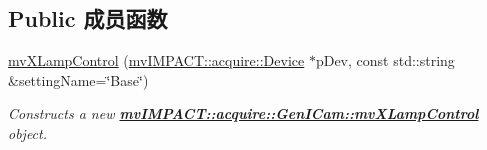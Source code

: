 \subsection*{Public 成员函数}
\begin{DoxyCompactItemize}
\item 
\hyperlink{classmv_i_m_p_a_c_t_1_1acquire_1_1_gen_i_cam_1_1mv_x_lamp_control_acea184fc039bfb70ca1c0950529a92b2}{mv\+X\+Lamp\+Control} (\hyperlink{classmv_i_m_p_a_c_t_1_1acquire_1_1_device}{mv\+I\+M\+P\+A\+C\+T\+::acquire\+::\+Device} $\ast$p\+Dev, const std\+::string \&setting\+Name=\char`\"{}Base\char`\"{})
\begin{DoxyCompactList}\small\item\em Constructs a new {\bfseries \hyperlink{classmv_i_m_p_a_c_t_1_1acquire_1_1_gen_i_cam_1_1mv_x_lamp_control}{mv\+I\+M\+P\+A\+C\+T\+::acquire\+::\+Gen\+I\+Cam\+::mv\+X\+Lamp\+Control}} object. \end{DoxyCompactList}\end{DoxyCompactItemize}
